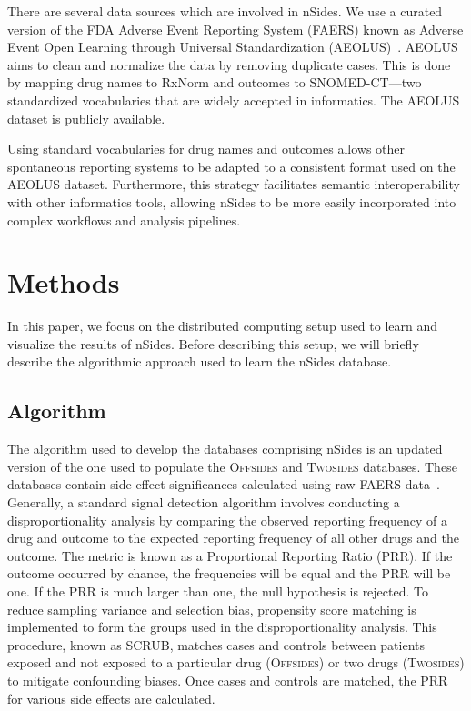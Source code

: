 \documentclass{ws-procs11x85}
\begin{document}
There are several data sources which are involved in nSides. We use a
curated version of the FDA Adverse Event Reporting System (FAERS)
known as Adverse Event Open Learning through Universal Standardization
(AEOLUS)~\cite{AEOLUS}.  AEOLUS aims to clean and normalize the data
by removing duplicate cases. This is done by mapping drug names to RxNorm and outcomes to SNOMED-CT---two standardized vocabularies that are widely accepted in informatics. The AEOLUS dataset is publicly available.

Using standard vocabularies for drug names and outcomes allows
other spontaneous reporting systems to be adapted to a consistent
format used on the AEOLUS dataset. Furthermore, this strategy facilitates
semantic interoperability with other informatics tools, allowing nSides to be
more easily incorporated into complex workflows and analysis pipelines.

\section{Methods}
In this paper, we focus on the distributed computing setup used to learn and visualize the results of nSides. Before describing this setup, we will briefly describe the algorithmic approach used to learn the nSides database.

\subsection{Algorithm}
The algorithm used to develop the databases comprising nSides is an
updated version of the one used to populate the O\textsc{ffsides} and
T\textsc{wosides} databases.  These databases contain side effect
significances calculated using raw FAERS data~\cite{Tatonetti2012}.
Generally, a standard signal detection algorithm involves conducting a
disproportionality analysis by comparing the observed reporting
frequency of a drug and outcome to the expected reporting frequency of
all other drugs and the outcome. The metric is known as a Proportional
Reporting Ratio (PRR). If the outcome occurred by chance, the
frequencies will be equal and the PRR will be one. If the PRR is much
larger than one, the null hypothesis is rejected. To reduce sampling
variance and selection bias, propensity score matching is implemented
to form the groups used in the disproportionality analysis. This
procedure, known as SCRUB, matches cases and controls between patients
exposed and not exposed to a particular drug (O\textsc{ffsides}) or
two drugs (T\textsc{wosides}) to mitigate confounding biases. Once
cases and controls are matched, the PRR for various side effects are
calculated.
\end{document}
